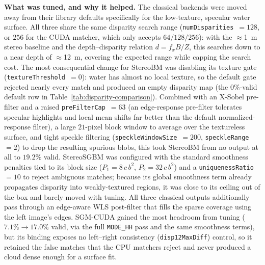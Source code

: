 \textbf{What was tuned, and why it helped.} The classical backends were moved away from their library defaults specifically for the low-texture, specular water surface. All three share the same disparity search range (\texttt{numDisparities}~$=128$, or $256$ for the CUDA matcher, which only accepts $64/128/256$): with the $\approx$1~m stereo baseline and the depth--disparity relation $d = f_x B / Z$, this searches down to a near depth of $\approx$12~m, covering the expected range while capping the search cost. The most consequential change for StereoBM was disabling its texture gate (\texttt{textureThreshold}~$=0$): water has almost no local texture, so the default gate rejected nearly every match and produced an empty disparity map (the $0\%$-valid default row in Table~\ref{tab:disparity-comparison}). Combined with an X-Sobel pre-filter and a raised \texttt{preFilterCap}~$=63$ (an edge-response pre-filter tolerates specular highlights and local mean shifts far better than the default normalized-response filter), a large $21$-pixel block window to average over the textureless surface, and tight speckle filtering (\texttt{speckleWindowSize}~$=200$, \texttt{speckleRange}~$=2$) to drop the resulting spurious blobs, this took StereoBM from no output at all to $19.2\%$ valid. StereoSGBM was configured with the standard smoothness penalties tied to its block size ($P_1 = 8\,c\,b^2$, $P_2 = 32\,c\,b^2$) and a \texttt{uniquenessRatio}~$=10$ to reject ambiguous matches; because its global smoothness term already propagates disparity into weakly-textured regions, it was close to its ceiling out of the box and barely moved with tuning. All three classical outputs additionally pass through an edge-aware WLS post-filter that fills the sparse coverage using the left image's edges. SGM-CUDA gained the most headroom from tuning ($7.1\% \to 17.0\%$ valid, via the full \texttt{MODE\_HH} pass and the same smoothness terms), but its binding exposes no left--right consistency (\texttt{disp12MaxDiff}) control, so it retained the false matches that the CPU matchers reject and never produced a cloud dense enough for a surface fit.

